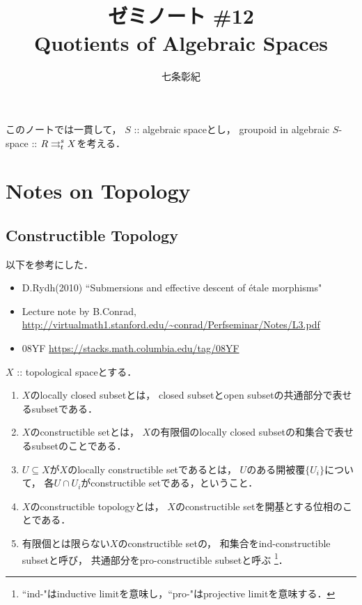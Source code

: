 \documentclass[a4paper, dvipdfmx]{jsarticle}
\begin{document}
\title{ゼミノート \#12 \\ Quotients of Algebraic Spaces}
\author{七条彰紀}
\maketitle
\tableofcontents
\vspace{10pt}

このノートでは一貫して，
$S$ :: algebraic spaceとし，
groupoid in algebraic $S$-space :: $R \mathrel{\mathop{\rightrightarrows}^{s}_{t}} X$を考える．

\section{Notes on Topology}
\subsection{Constructible Topology}
以下を参考にした．
\begin{itemize}
    \item D.Rydh(2010) ``Submersions and effective descent of étale morphisms"
    \item Lecture note by B.Conrad,
        \url{http://virtualmath1.stanford.edu/~conrad/Perfseminar/Notes/L3.pdf}
    \item \cite{SP} 08YF \url{https://stacks.math.columbia.edu/tag/08YF}
\end{itemize}

\begin{Def}
    $X$ :: topological spaceとする．
    \begin{enumerate}
    \item 
        $X$のlocally closed subsetとは，
        closed subsetとopen subsetの共通部分で表せるsubsetである．

    \item
        $X$のconstructible setとは，
        $X$の有限個のlocally closed subsetの和集合で表せるsubsetのことである．

    \item
        $U \subseteq X$が$X$のlocally constructible setであるとは，
        $U$のある開被覆$\{U_i\}$について，
        各$U \cap U_i$がconstructible setである，ということ．

    \item
        $X$のconstructible topologyとは，
        $X$のconstructible setを開基とする位相のことである．

    \item
        有限個とは限らない$X$のconstructible setの，
        和集合をind-constructible subsetと呼び，
        共通部分をpro-constructible subsetと呼ぶ
        \footnote{ ``ind-"はinductive limitを意味し，``pro-"はprojective limitを意味する． }．
    \end{enumerate}
\end{Def}
\end{document}
